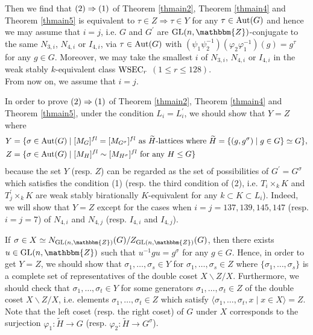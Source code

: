 \documentclass{amsart}
\theoremstyle{plain}
\theoremstyle{definition}
\theoremstyle{remark}
\newcommand{\bZ}{\mathbbm{Z}}\newcommand{\bQ}{\mathbbm{Q}}
\newcommand{\GL}{{\rm GL}}\newcommand{\SL}{{\rm SL}}
\newcounter{sub}\def\tr{\mbox{tr }}
\begin{document}
{{Then we find that ${\rm (2)}\Rightarrow {\rm (1)}$ of 
{Theorem \ref{thmain2}}, {Theorem \ref{thmain4}} and {Theorem \ref{thmain5}} 
is equivalent to $\tau\in Z\Rightarrow \tau \in Y$ 
for any $\tau\in {\rm Aut}(G)$ 
and hence 
we may assume that $i=j$, 
i.e. $G$ and $G^\prime$ are $\GL(n,\bZ)$-conjugate 
to the same $N_{3,i}$, $N_{4,i}$ or $I_{4,i}$, 
via $\tau\in {\rm Aut}(G)$ with 
$(\psi_1\psi_2^{-1})(\varphi_2\varphi_1^{-1})(g)=g^\tau$ 
for any $g\in G$. 
Moreover, we may take the smallest $i$ of 
$N_{3,i}$, $N_{4,i}$ or $I_{4,i}$ 
in the weak stably $k$-equivalent class ${\rm WSEC}_r$ $(1\leq r\leq 128)$.\\

From now on, we assume that $i=j$. 

In order to prove 
${\rm (2)}\Rightarrow {\rm (1)}$ of 
{Theorem \ref{thmain2}}, {Theorem \ref{thmain4}} and {Theorem \ref{thmain5}}, 
under the condition $L_i=L^\prime_i$, 
we should show that $Y=Z$ 
where 
\begin{align*}
Y&=\{\sigma\in{\rm Aut}(G)\mid [M_G]^{fl}=[M_{G^\sigma}]^{fl}\ {\rm as}\ 
\widetilde{H}\textrm{-lattices}\ {\rm where}\ \widetilde{H}=\{(g,g^\sigma)\mid g\in G\}\simeq G\},\\
Z&=\{\sigma\in{\rm Aut}(G)\mid [M_H]^{fl}\sim [M_{H^\sigma}]^{fl}\ {\rm for}\ {\rm any}\ H\leq G\}
\end{align*}
because the set $Y$ (resp. $Z$) can be regarded as the set 
of possibilities of $G^\prime=G^\sigma$ 
which satisfies the condition (1) (resp. the third condition of (2), i.e. 
$T_i\times_k K$ and $T_j^\prime\times_k K$ 
are weak stably birationally $K$-equivalent 
for any $k\subset K\subset L_i$). 
Indeed, we will show that $Y=Z$ 
except for the cases 
when $i=j=137,139,145,147$ (resp. $i=j=7$) 
of $N_{4,i}$ and $N_{4,j}$ (resp. $I_{4,i}$ and $I_{4,j}$). 

If $\sigma\in X\simeq N_{\GL(n,\bZ)}(G)/Z_{\GL(n,\bZ)}(G)$, then 
there exists $u\in {\rm GL}(n,\bZ)$ such that
$u^{-1}gu=g^\sigma$ for any $g\in G$. 
%
Hence, in order to get $Y=Z$, we should show that 
$\sigma_1,\ldots,\sigma_s\in Y$ 
for $\sigma_1,\ldots,\sigma_s\in Z$ 
where $\{\sigma_1,\ldots,\sigma_s\}$ 
is a complete set of representatives 
of the double coset $X\backslash Z/X$. 
Furthermore, we should check that $\sigma_1,\ldots,\sigma_t\in Y$ 
for some generators $\sigma_1,\ldots,\sigma_t\in Z$ 
of the double coset $X\backslash Z/X$, i.e. 
elements $\sigma_1,\ldots,\sigma_t\in Z$ 
which satisfy $\langle \sigma_1,\ldots,\sigma_t,x\mid x\in X\rangle=Z$. 
Note that the left coset (resp. the right coset) of $G$ under $X$ 
corresponds to the surjection $\varphi_1:\widetilde{H}\rightarrow G$ 
(resp. $\varphi_2:\widetilde{H}\rightarrow G^\sigma$).\\

}}
\end{document}
